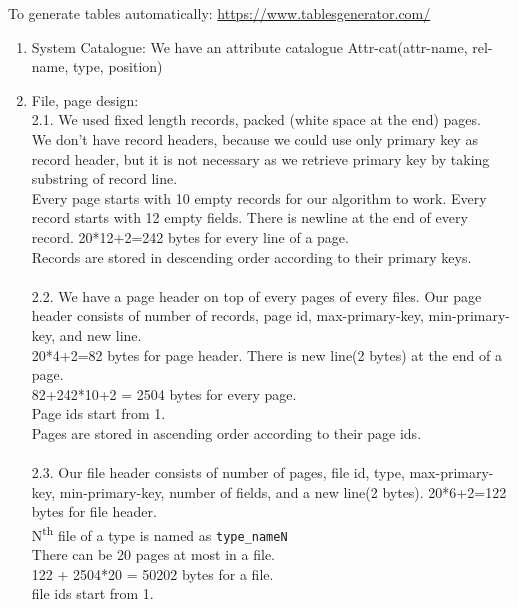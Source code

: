 \documentclass{article}
\begin{document}
To generate tables automatically: \url{https://www.tablesgenerator.com/}
\begin{enumerate}
    \item System Catalogue: We have an attribute catalogue 
    Attr-cat(attr-name, rel-name, type, position)
    \item File, page design: \\
    2.1. We used fixed length records, packed (white space at the end) pages. \\We don't have record headers, because we could use only primary key as record header, but it is not necessary as we retrieve primary key by taking substring of record line. \\
    Every page starts with 10 empty records for our algorithm to work. Every record starts with 12 empty fields. There is newline at the end of every record. 20*12+2=242 bytes for every line of a page. \\
    Records are stored in descending order according to their primary keys.\\ \\
    2.2. We have a page header on top of every pages of every files. Our page header consists of number of records, page id, max-primary-key, min-primary-key, and new line.\\ 20*4+2=82 bytes for page header. There is new line(2 bytes) at the end of a page. \\
    82+242*10+2 = 2504 bytes for every page. \\
    Page ids start from 1. \\
    Pages are stored in ascending order according to their page ids.\\ \\
    2.3. Our file header consists of number of pages, file id, type, max-primary-key, min-primary-key, number of fields, and a new line(2 bytes). 20*6+2=122 bytes for file header. \\
    N\textsuperscript{th} file of a type is named as \texttt{type\_nameN} \\
    There can be 20 pages at most in a file. \\
    122 + 2504*20 = 50202 bytes for a file.\\
    file ids start from 1.
\end{enumerate}
\end{document}
